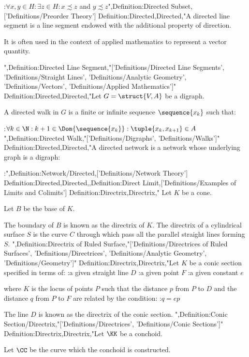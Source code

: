 :$\forall x, y \in H: \exists z \in H: x \precsim z$ and $y \precsim z$",Definition:Directed Subset,['Definitions/Preorder Theory']
Definition:Directed,Directed,"A directed line segment is a line segment endowed with the additional property of direction.

It is often used in the context of applied mathematics to represent a vector quantity.





",Definition:Directed Line Segment,"['Definitions/Directed Line Segments', 'Definitions/Straight Lines', 'Definitions/Analytic Geometry', 'Definitions/Vectors', 'Definitions/Applied Mathematics']"
Definition:Directed,Directed,"Let $G = \struct {V, A}$ be a digraph.


A directed walk in $G$ is a finite or infinite sequence $\sequence {x_k}$ such that:

:$\forall k \in \N: k + 1 \in \Dom {\sequence {x_k} }: \tuple {x_k, x_{k + 1} } \in A$
",Definition:Directed Walk,"['Definitions/Digraphs', 'Definitions/Walks']"
Definition:Directed,Directed,"A directed network is a network whose underlying graph is a digraph:


:",Definition:Network/Directed,['Definitions/Network Theory']
Definition:Directed,Directed,,Definition:Direct Limit,['Definitions/Examples of Limits and Colimits']
Definition:Directrix,Directrix,"
Let $K$ be a cone.

Let $B$ be the base of $K$.


The boundary of $B$ is known as the directrix of $K$.
The directrix of a cylindrical surface $S$ is the curve $C$ through which pass all the parallel straight lines forming $S$.
",Definition:Directrix of Ruled Surface,"['Definitions/Directrices of Ruled Surfaces', 'Definitions/Directrices', 'Definitions/Analytic Geometry', 'Definitions/Geometry']"
Definition:Directrix,Directrix,"Let $K$ be a conic section specified in terms of:
:a given straight line $D$
:a given point $F$
:a given constant $e$

where $K$ is the locus of points $P$ such that the distance $p$ from $P$ to $D$ and the distance $q$ from $P$ to $F$ are related by the condition:
:$q = e p$


The line $D$ is known as the directrix of the conic section.
",Definition:Conic Section/Directrix,"['Definitions/Directrices', 'Definitions/Conic Sections']"
Definition:Directrix,Directrix,"Let $\KK$ be a conchoid.

Let $\CC$ be the curve  which the conchoid is constructed.


